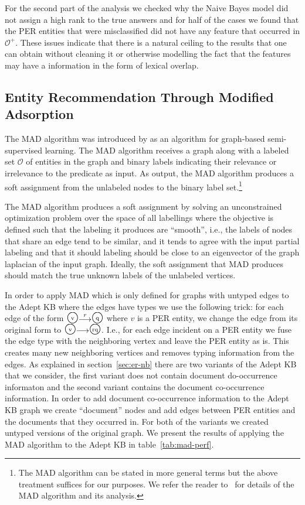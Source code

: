 \documentclass[paper=a4,fontsize=11pt]{scrartcl}
\newcommand{\ie}{i.e.,\xspace}
\newcommand{\Ie}{I.e.,\xspace}
\newcommand{\secref}[1]{section~\ref{#1}}
\newcommand{\tabref}[1]{table~\ref{#1}}
\numberwithin{equation}{section}    %
\numberwithin{figure}{section}      %
\numberwithin{table}{section}       %
\def\overstrike#1#2{{\setbox0\hbox{$#2$}\hbox to \wd0{\hss$#1$\hss}\kern-\wd0\box0}}
\newcommand{\bigstaten}[1]{\overstrike{\protect\raisebox{1pt}{\mbox{\scriptsize #1}}}{\mbox{\Large $\bigcirc$}}}
\newcommand{\shortarc}[1]{\protect\raisebox{-1pt}{$\stackrel{#1}{\longrightarrow}$}}
\begin{document}
For the second part of the analysis we checked why the Naive Bayes model did
not assign a high rank
to the true answers and for half of the cases we found that the \textsc{PER}
entities that were misclassified did not have any feature that occurred in $\mathcal{O}^{+}$.
These issues indicate that there is a natural ceiling to the results that one can obtain without
cleaning it or otherwise modelling the fact that the features may have a information in the form of lexical overlap.

\subsection{Entity Recommendation Through Modified Adsorption}
\label{sec:er-lp}
The MAD algorithm was introduced by \citep{talukdar2009new} as an algorithm
for graph-based semi-supervised learning. The MAD algorithm receives a graph along with
a labeled set $\mathcal{O}$ of entities in the graph and binary labels indicating
their relevance or irrelevance to the predicate as input. As output, the MAD algorithm
produces a soft assignment from the unlabeled nodes to the binary label set.\footnote{The MAD algorithm can be stated in more general terms but the above treatment suffices for our purposes. We refer the reader to~\citep{talukdar2009new} for details of the MAD algorithm
and its analysis.}

The MAD algorithm produces a soft assignment by solving an unconstrained
optimization problem over the space of all labellings where the objective
is defined such that the labeling it produces are ``smooth'', \ie the
labels of nodes that share an edge tend to be similar, and it tends to agree with
the input partial labeling and that it should labeling should be close to an
eigenvector of the graph laplacian of the input graph.
Ideally, the soft assignment that MAD produces should match the true
unknown labels of the unlabeled vertices.

In order to apply MAD which is only defined for graphs with untyped edges to the
Adept KB where the edges have types we use the following trick:
for each edge of the form $\bigstaten{v} \shortarc{r} \bigstaten{q}$ where $v$
is a \textsc{PER} entity, we change the edge from its original form to
$\bigstaten{v} \shortarc{} \bigstaten{rq}$. \Ie for each edge incident on a
\textsc{PER} entity we fuse the edge type with the neighboring vertex and leave
the \textsc{PER} entity as is. This creates many new neighboring vertices and
removes typing information from the edges.
As explained in \secref{sec:er-nb} there are two variants of the Adept KB that
we consider, the first variant does not contain document do-occurrence
informaton and the second variant contains the document co-occurrence
information. In order to add document co-occurrence information to the Adept KB
graph we create ``document'' nodes and add edges between \textsc{PER} entities
and the documents that they occurred in. For both of the variants we created
untyped versions of the original graph. We present the results of applying the
MAD algorithm to the Adept KB in \tabref{tab:mad-perf}.
\end{document}
